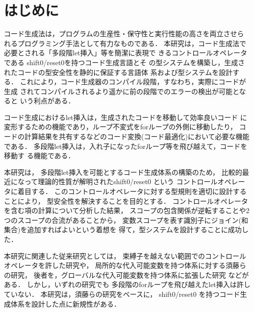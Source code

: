 
\section{はじめに}
コード生成法は，プログラムの生産性・保守性と実行性能の高さを両立させら
れるプログラミング手法として有力なものである．
本研究は，コード生成法で必要とされる「多段階let挿入」等を簡潔に表現で
きるコントロールオペレータである shift0/reset0を持つコード生成言語とそ
の型システムを構築し，生成されたコードの型安全性を静的に保証する言語体
系および型システムを設計する．
これにより，コード生成器のコンパイル段階，すなわち，実際にコードが生成
されてコンパイルされるより遥かに前の段階でのエラーの検出が可能となると
いう利点がある．

コード生成におけるlet挿入は，生成されたコードを移動して効率良いコード
に変形するための機能であり，ループ不変式をforループの外側に移動したり，
コードの計算結果を共有するなどのコード変換(コード最適化)において必要な機能である．
多段階let挿入は，入れ子になったforループ等を飛び越えて，コードを移動す
る機能である．



本研究は，
多段階let挿入を可能とするコード生成体系の構築のため，
比較的最近になって理論的性質が解明されたshift0/reset0\cite{Materzok2011} という
コントロールオペレータに着目する．
このコントロールオペレータに対する型規則を適切に設計することにより，
型安全性を解決することを目的とする．
コントロールオペレータを含む項の計算について分析した結果，
スコープの包含関係が逆転することや2つのスコープの合流があることから，
変数スコープを表す識別子にジョイン(和集合)を追加すればよいという着想を
得て，型システムを設計することに成功した．

本研究に関連した従来研究としては，
束縛子を越えない範囲でのコントロールオペレータを許した研究や，
局所的な代入可能変数を持つ体系に対する須藤らの研究\cite{Sudo2014}，
後者を，グローバルな代入可能変数を持つ体系に拡張した研究
\cite{Aplas2016}などがある．
しかし，いずれの研究でも 多段階のforループを飛び越えたlet挿入は許していない．
本研究は，須藤らの研究をベースに，
shift0/reset0 を持つコード生成体系を設計した点に新規性がある．
